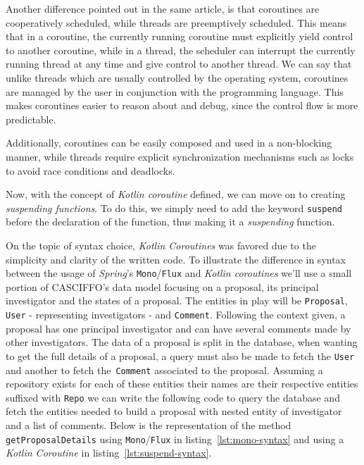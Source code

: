 Another difference pointed out in the same article, is that coroutines are cooperatively scheduled, while threads are preemptively scheduled. This means that in a coroutine, the currently running coroutine must explicitly yield control to another coroutine, while in a thread, the scheduler can interrupt the currently running thread at any time and give control to another thread. We can say that unlike threads which are usually controlled by the operating system, coroutines are managed by the user in conjunction with the programming language. This makes coroutines easier to reason about and debug, since the control flow is more predictable.

Additionally, coroutines can be easily composed and used in a non-blocking manner, while threads require explicit synchronization mechanisms such as locks to avoid race conditions and deadlocks.

Now, with the concept of \textit{Kotlin coroutine} defined, we can move on to creating \textit{suspending functions}. 
To do this, we simply need to add the keyword \lstinline{suspend} before the declaration of the function, thus making it a \textit{suspending} function.

On the topic of syntax choice, \textit{Kotlin Coroutines} was favored due to the simplicity and clarity of the written code.
To illustrate the difference in syntax between the usage of \textit{Spring}'s \lstinline{Mono}/\lstinline{Flux} and \textit{Kotlin coroutines} we'll use a small portion of CASCIFFO's data model focusing on a proposal, its principal investigator and the states of a proposal. The entities in play will be \lstinline{Proposal}, \lstinline{User} - representing investigators - and \lstinline{Comment}. Following the context given, a proposal has one principal investigator and can have several comments made by other investigators. The data of a proposal is split in the database, when wanting to get the full details of a proposal, a query must also be made to fetch the \lstinline{User} and another to fetch the~\lstinline{Comment} associated to the proposal. Assuming a repository exists for each of these entities their names are their respective entities suffixed with \lstinline{Repo} we can write the following code to query the database and fetch the entities needed to build a proposal with nested entity of investigator and a list of comments.
Below is the representation of the method \lstinline{getProposalDetails} using \lstinline{Mono}/\lstinline{Flux} in listing~\ref{lst:mono-syntax} and using a \textit{Kotlin Coroutine} in listing~\ref{lst:suspend-syntax}.

